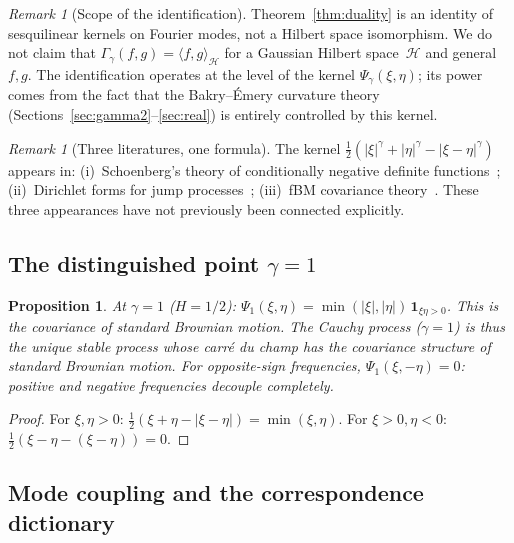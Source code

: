 \documentclass[11pt,a4paper]{article}
\theoremstyle{plain}
\newtheorem{proposition}[theorem]{Proposition}
\theoremstyle{definition}
\theoremstyle{remark}
\newtheorem{remark}[theorem]{Remark}
\begin{document}
\begin{remark}[Scope of the identification]\label{rem:scope}
Theorem~\ref{thm:duality} is an identity of sesquilinear kernels
on Fourier modes, not a Hilbert space isomorphism. We do not claim
that $\Gamma_\gamma(f,g) = \langle f,g \rangle_{\mathcal{H}}$ for
a Gaussian Hilbert space~$\mathcal{H}$ and general $f,g$.
The identification operates at the level of the kernel
$\Psi_\gamma(\xi,\eta)$; its power comes from the fact that the
Bakry--\'Emery curvature theory (Sections~\ref{sec:gamma2}--\ref{sec:real})
is entirely controlled by this kernel.
\end{remark}

\begin{remark}[Three literatures, one formula]\label{rem:three}
The kernel $\frac{1}{2}(|\xi|^\gamma + |\eta|^\gamma
- |\xi-\eta|^\gamma)$ appears in:
(i)~Schoenberg's theory of conditionally negative definite
functions~\cite{Schoenberg1938};
(ii)~Dirichlet forms for jump
processes~\cite{BoettcherSchillingWang2013};
(iii)~fBM covariance theory~\cite{Mishura2008}.
These three appearances have not previously been connected explicitly.
\end{remark}


\subsection{The distinguished point $\gamma = 1$}

\begin{proposition}\label{prop:self-dual}
At $\gamma = 1$ ($H = 1/2$):
$\Psi_1(\xi,\eta)
= \min(|\xi|, |\eta|)\,\mathbf{1}_{\xi\eta > 0}$.
This is the covariance of standard Brownian motion.
The Cauchy process ($\gamma = 1$) is thus the unique stable process
whose carr\'e du champ has the covariance structure of standard
Brownian motion.
For opposite-sign frequencies, $\Psi_1(\xi,-\eta) = 0$:
positive and negative frequencies decouple completely.
\end{proposition}

\begin{proof}
For $\xi, \eta > 0$:
$\frac{1}{2}(\xi + \eta - |\xi - \eta|) = \min(\xi, \eta)$.
For $\xi > 0, \eta < 0$:
$\frac{1}{2}(\xi - \eta - (\xi - \eta)) = 0$.
\end{proof}


\subsection{Mode coupling and the correspondence dictionary}
\end{document}
